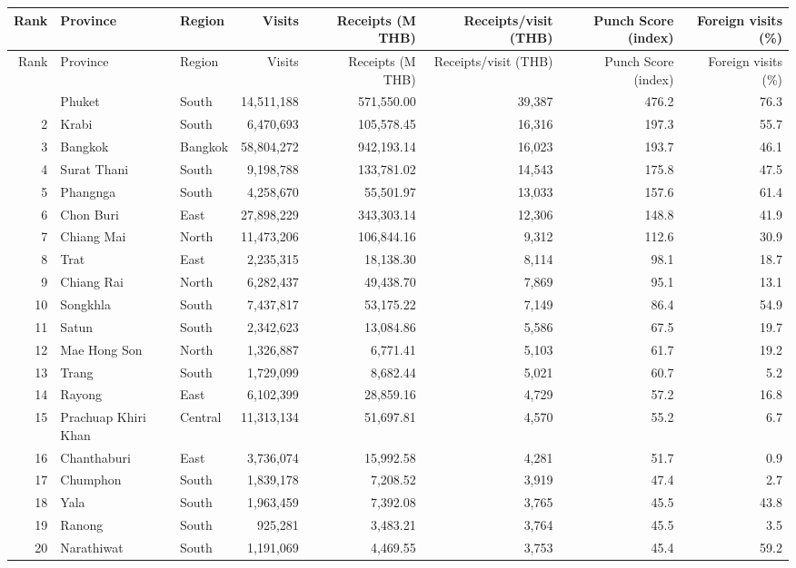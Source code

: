 \begin{longtable}{rllrrrrr}
\toprule
Rank & Province & Region & Visits & Receipts (M THB) & Receipts/visit (THB) & Punch Score (index) & Foreign visits (\%) \\
\midrule
\endfirsthead
\toprule
Rank & Province & Region & Visits & Receipts (M THB) & Receipts/visit (THB) & Punch Score (index) & Foreign visits (\%) \\
\midrule
\endhead
\bottomrule
\endfoot
1 & Phuket & South & 14,511,188 & 571,550.00 & 39,387 & 476.2 & 76.3 \\
2 & Krabi & South & 6,470,693 & 105,578.45 & 16,316 & 197.3 & 55.7 \\
3 & Bangkok & Bangkok & 58,804,272 & 942,193.14 & 16,023 & 193.7 & 46.1 \\
4 & Surat Thani & South & 9,198,788 & 133,781.02 & 14,543 & 175.8 & 47.5 \\
5 & Phangnga & South & 4,258,670 & 55,501.97 & 13,033 & 157.6 & 61.4 \\
6 & Chon Buri & East & 27,898,229 & 343,303.14 & 12,306 & 148.8 & 41.9 \\
7 & Chiang Mai & North & 11,473,206 & 106,844.16 & 9,312 & 112.6 & 30.9 \\
8 & Trat & East & 2,235,315 & 18,138.30 & 8,114 & 98.1 & 18.7 \\
9 & Chiang Rai & North & 6,282,437 & 49,438.70 & 7,869 & 95.1 & 13.1 \\
10 & Songkhla & South & 7,437,817 & 53,175.22 & 7,149 & 86.4 & 54.9 \\
11 & Satun & South & 2,342,623 & 13,084.86 & 5,586 & 67.5 & 19.7 \\
12 & Mae Hong Son & North & 1,326,887 & 6,771.41 & 5,103 & 61.7 & 19.2 \\
13 & Trang & South & 1,729,099 & 8,682.44 & 5,021 & 60.7 & 5.2 \\
14 & Rayong & East & 6,102,399 & 28,859.16 & 4,729 & 57.2 & 16.8 \\
15 & Prachuap Khiri Khan & Central & 11,313,134 & 51,697.81 & 4,570 & 55.2 & 6.7 \\
16 & Chanthaburi & East & 3,736,074 & 15,992.58 & 4,281 & 51.7 & 0.9 \\
17 & Chumphon & South & 1,839,178 & 7,208.52 & 3,919 & 47.4 & 2.7 \\
18 & Yala & South & 1,963,459 & 7,392.08 & 3,765 & 45.5 & 43.8 \\
19 & Ranong & South & 925,281 & 3,483.21 & 3,764 & 45.5 & 3.5 \\
20 & Narathiwat & South & 1,191,069 & 4,469.55 & 3,753 & 45.4 & 59.2 \\

\end{longtable}
